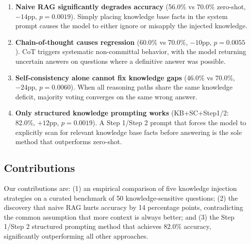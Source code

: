 \begin{enumerate}
\item \textbf{Naive RAG significantly degrades accuracy} (56.0\% vs 70.0\% zero-shot, $-14$pp, $p=0.0019$). Simply placing knowledge base facts in the system prompt causes the model to either ignore or misapply the injected knowledge.

\item \textbf{Chain-of-thought causes regression} (60.0\% vs 70.0\%, $-10$pp, $p=0.0055$). CoT triggers systematic non-committal behavior, with the model returning uncertain answers on questions where a definitive answer was possible.

\item \textbf{Self-consistency alone cannot fix knowledge gaps} (46.0\% vs 70.0\%, $-24$pp, $p=0.0060$). When all reasoning paths share the same knowledge deficit, majority voting converges on the same wrong answer.

\item \textbf{Only structured knowledge prompting works} (KB+SC+Step1/2: 82.0\%, $+12$pp, $p=0.0019$). A Step 1/Step 2 prompt that forces the model to explicitly scan for relevant knowledge base facts before answering is the sole method that outperforms zero-shot.
\end{enumerate}

\subsection{Contributions}

Our contributions are: (1) an empirical comparison of five knowledge injection strategies on a curated benchmark of 50 knowledge-sensitive questions; (2) the discovery that naive RAG hurts accuracy by 14 percentage points, contradicting the common assumption that more context is always better; and (3) the Step 1/Step 2 structured prompting method that achieves 82.0\% accuracy, significantly outperforming all other approaches.
